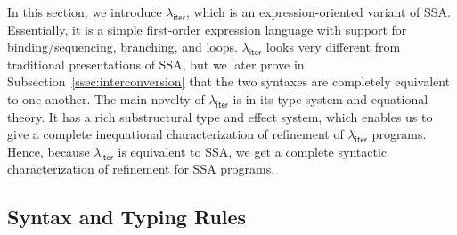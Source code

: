 \documentclass[acmsmall,screen,review]{acmart}
\newcommand{\ms}[1]{\ensuremath{\mathsf{#1}}}
\newcommand{\subiterexp}{\texorpdfstring{\(\lambda_{\ms{iter}}\)}{lambda-iter}}
\begin{document}
In this section, we introduce \subiterexp{}, which is an expression-oriented variant of SSA.
Essentially, it is a simple first-order expression language with support for binding/sequencing,
branching, and loops. \subiterexp{} looks very different from traditional presentations of SSA, but
we later prove in Subsection~\ref{ssec:interconversion} that the two syntaxes are completely
equivalent to one another. The main novelty of \subiterexp{} is in its type system and equational theory.
It has a rich substructural type and effect system, which enables us to give a complete inequational
characterization of refinement of \subiterexp{} programs. Hence, because \subiterexp{} is equivalent
to SSA, we get a complete syntactic characterization of refinement for SSA programs. 

% 
% 
\subsection{Syntax and Typing Rules}
\end{document}
